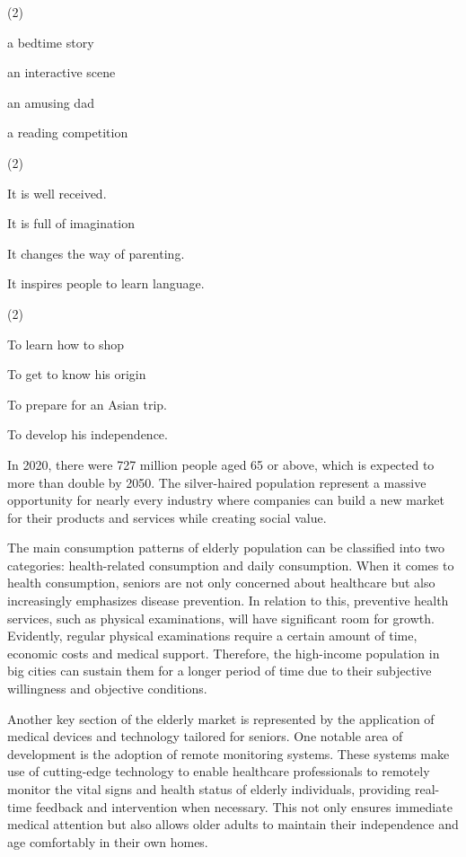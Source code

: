 \documentclass{英语试卷}
\begin{document}
\begin{choices}(2)
  \item a bedtime story
  \item an interactive scene
  \item an amusing dad
  \item a reading competition
\end{choices}
\begin{choices}(2)
  \item It is well received.
  \item It is full of imagination
  \item It changes the way of parenting.
  \item It inspires people to learn language.
\end{choices}
\begin{choices}(2)
  \item To learn how to shop
  \item To get to know his origin
  \item To prepare for an Asian trip.
  \item To develop his independence.
\end{choices}
\par In 2020, there were 727 million people aged 65 or above, which is expected to more than double by 2050. The silver-haired population represent a massive opportunity for nearly every industry where companies can build a new market for their products and services while creating social value.\par
\par The main consumption patterns of elderly population can be classified into two categories: health-related consumption and daily consumption. When it comes to health consumption, seniors are not only concerned about healthcare but also increasingly emphasizes disease prevention. In relation to this, preventive health services, such as physical examinations, will have significant room for growth. Evidently, regular physical examinations require a certain amount of time, economic costs and medical support. Therefore, the high-income population in big cities can sustain them for a longer period of time due to their subjective willingness and objective conditions.\par
\par Another key section of the elderly market is represented by the application of medical devices and technology tailored for seniors. One notable area of development is the adoption of remote monitoring systems. These systems make use of cutting-edge technology to enable healthcare professionals to remotely monitor the vital signs and health status of elderly individuals, providing real-time feedback and intervention when necessary. This not only ensures immediate medical attention but also allows older adults to maintain their independence and age comfortably in their own homes.\par
\end{document}
